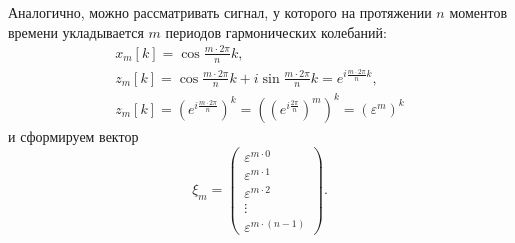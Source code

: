 Аналогично, можно рассматривать сигнал, у которого на протяжении $n$ моментов времени укладывается $m$ периодов гармонических колебаний:
\begin{gather*}
    x_m[k]
    = \cos \frac{m \cdot 2 \pi}{n} k , \\
    z_m[k]
    = \cos \frac{m \cdot 2 \pi}{n} k + i \sin \frac{m \cdot 2 \pi}{n} k
    = e^{i \frac{m \cdot 2 \pi}{n} k}, \\
    z_m[k]
    = \left( e^{i \frac{m \cdot 2 \pi}{n}} \right)^k
    = \left( \left( e^{i \frac{2 \pi}{n}} \right)^m \right)^k
    = \left( \varepsilon^m \right)^k
\end{gather*}
и сформируем вектор
\[
    \xi_m
    = \begin{pmatrix}
        \varepsilon^{m \cdot 0} \\
        \varepsilon^{m \cdot 1} \\
        \varepsilon^{m \cdot 2} \\
        \vdots                  \\
        \varepsilon^{m \cdot (n-1)}
    \end{pmatrix} .
\]

